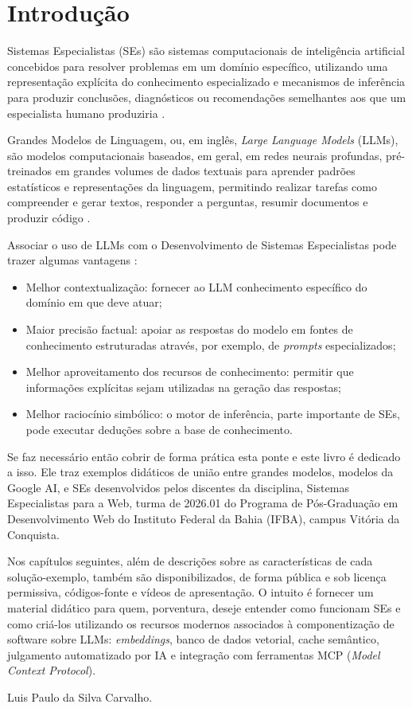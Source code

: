 \chapter*{Introdução}

Sistemas Especialistas (SEs) são sistemas computacionais de inteligência artificial concebidos para resolver problemas em um domínio específico, utilizando uma representação explícita do conhecimento especializado e mecanismos de inferência para produzir conclusões, diagnósticos ou recomendações semelhantes aos que um especialista humano produziria \cite{giarratano1998expert}.

Grandes Modelos de Linguagem, ou, em inglês, \textit{Large Language Models} (LLMs), são modelos computacionais baseados, em geral, em redes neurais profundas, pré-treinados em grandes volumes de dados textuais para aprender padrões estatísticos e representações da linguagem, permitindo realizar tarefas como compreender e gerar textos, responder a perguntas, resumir documentos e produzir código \cite{minaee2024large}.

Associar o uso de LLMs com o Desenvolvimento de Sistemas Especialistas pode trazer  algumas vantagens \cite{yang2025comprehensive, garridomerchan2026gofai}:

\begin{itemize}
    \item Melhor contextualização: fornecer ao LLM conhecimento específico do domínio em que deve atuar;
    \item Maior precisão factual: apoiar as respostas do modelo em fontes de conhecimento estruturadas através, por exemplo, de \textit{prompts} especializados;
    \item Melhor aproveitamento dos recursos de conhecimento: permitir que informações explícitas sejam utilizadas na geração das respostas;
    \item Melhor raciocínio simbólico: o motor de inferência, parte importante de SEs, pode executar deduções sobre a base de conhecimento.
\end{itemize}

Se faz necessário então cobrir de forma prática esta ponte e este livro é dedicado a isso. Ele traz exemplos didáticos de união entre grandes modelos,  modelos da Google AI, e SEs desenvolvidos pelos discentes da disciplina, Sistemas Especialistas para a Web, turma de 2026.01 do Programa de Pós-Graduação em Desenvolvimento Web do Instituto Federal da Bahia (IFBA), campus Vitória da Conquista.

Nos capítulos seguintes, além de descrições sobre as características de cada solução-exemplo, também são disponibilizados, de forma pública e sob licença permissiva, códigos-fonte e vídeos de apresentação. O intuito é fornecer um material didático para quem, porventura, deseje entender como funcionam SEs e como criá-los utilizando os recursos modernos associados à componentização de software sobre LLMs: \textit{embeddings}, banco de dados vetorial, cache semântico, julgamento automatizado por IA \cite{azevedo2026julgamento} e integração com ferramentas MCP (\textit{Model Context Protocol}).

\begin{flushright}
Luis Paulo da Silva Carvalho.
\end{flushright}